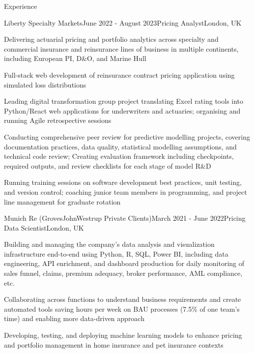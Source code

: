 \documentclass{resume} %
\begin{document}
\begin{rSection}{Experience}

\begin{rSubsection}{Liberty Specialty Markets}{June 2022 - August 2023}{Pricing Analyst}{London, UK}
	\item Delivering actuarial pricing and portfolio analytics across specialty and commercial insurance and reinsurance lines of business in multiple continents, including European PI, D\&O, and Marine Hull
	\item Full-stack web development of reinsurance contract pricing application using simulated loss distributions
	\item Leading digital transformation group project translating Excel rating tools into Python/React web applications for underwriters and actuaries; organising and running Agile retrospective sessions
	\item Conducting comprehensive peer review for predictive modelling projects, covering documentation practices, data quality, statistical modelling assumptions, and technical code review; Creating evaluation framework including checkpoints, required outputs, and review checklists for each stage of model R\&D
	\item Running training sessions on software development best practices, unit testing, and version control; coaching junior team members in programming, and project line management for graduate rotation
\end{rSubsection}


\begin{rSubsection}{Munich Re (GrovesJohnWestrup Private Clients)}{March 2021 - June 2022}{Pricing Data Scientist}{London, UK}
	\item Building and managing the company's data analysis and visualization infrastructure end-to-end using Python, R, SQL, Power BI, including data engineering, API enrichment, and dashboard production for daily monitoring of sales funnel, claims, premium adequacy, broker performance, AML compliance, etc.
	\item Collaborating across functions to understand business requirements and create automated tools saving hours per week on BAU processes (7.5\% of one team's time) and enabling more data-driven approach
	\item Developing, testing, and deploying machine learning models to enhance pricing and portfolio management in home insurance and pet insurance contexts
\end{rSubsection}


\end{rSection}
\end{document}
